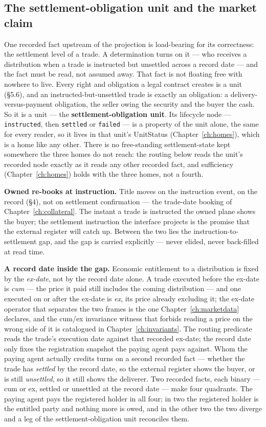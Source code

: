 \documentclass[11pt,a4paper]{article}
\begin{document}
\subsection{The settlement-obligation unit and the market claim}

One recorded fact upstream of the projection is load-bearing for its correctness:
the settlement level of a trade. A determination turns on it --- who receives a
distribution when a trade is instructed but unsettled across a record date --- and
the fact must be read, not assumed away. That fact is not floating free with nowhere
to live. Every right and obligation a legal contract creates is a unit (\S5.6), and an
instructed-but-unsettled trade is exactly an obligation: a delivery-versus-payment
obligation, the seller owing the security and the buyer the cash. So it is a unit ---
the \textbf{settlement-obligation unit}. Its lifecycle node --- \texttt{instructed},
then \texttt{settled} or \texttt{failed} --- is a property of the unit alone, the same
for every reader, so it lives in that unit's UnitStatus (Chapter~\ref{ch:homes}), which
is a home like any other. There is no free-standing settlement-state kept somewhere the
three homes do not reach: the routing below reads the unit's recorded node exactly as it
reads any other recorded fact, and sufficiency (Chapter~\ref{ch:homes}) holds with the
three homes, not a fourth.

\medskip\noindent\textbf{Owned re-books at instruction.} Title moves on the
instruction event, on the record (\S4), not on settlement confirmation --- the
trade-date booking of Chapter~\ref{ch:collateral}. The instant a trade is
instructed the owned plane shows the buyer; the settlement instruction the
interface projects is the promise that the external register will catch up. Between
the two lies the instruction-to-settlement gap, and the gap is carried explicitly
--- never elided, never back-filled at read time.

\medskip\noindent\textbf{A record date inside the gap.} Economic entitlement to a
distribution is fixed by the \emph{ex-date}, not by the record date alone. A trade
executed before the ex-date is \emph{cum} --- the price it paid still includes the
coming distribution --- and one executed on or after the ex-date is \emph{ex}, its
price already excluding it; the ex-date operator that separates the two frames is the
one Chapter~\ref{ch:marketdata} declares, and the cum/ex invariance witness that
forbids reading a price on the wrong side of it is catalogued in
Chapter~\ref{ch:invariants}. The routing predicate reads the trade's execution date
against that recorded ex-date; the record date only fixes the registration snapshot
the paying agent pays against. Whom the paying agent actually credits turns on a second
recorded fact --- whether the trade has \emph{settled} by the record date, so the
external register shows the buyer, or is still \emph{unsettled}, so it still shows the
deliverer. Two recorded facts, each binary --- cum or ex, settled or unsettled at the
record date --- make four quadrants. The paying agent pays the registered holder in
all four; in two the registered holder is the entitled party and nothing more is owed,
and in the other two the two diverge and a leg of the settlement-obligation unit
reconciles them.
\end{document}
